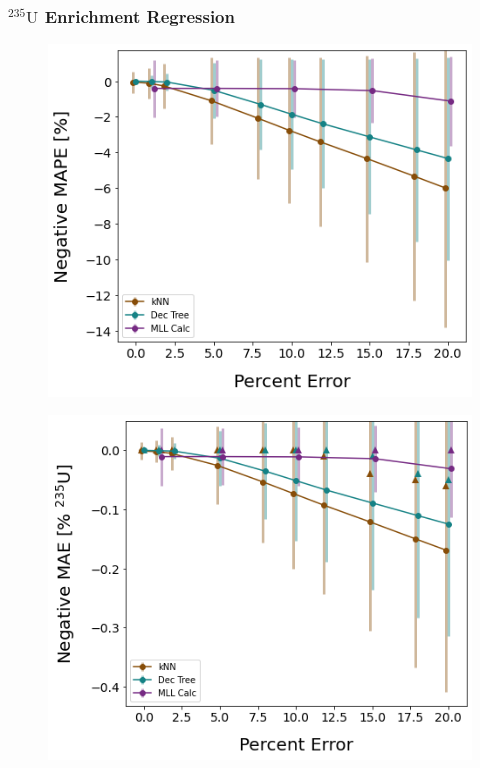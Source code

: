 \begin{frame}
  \frametitle{${}^{235}\text{U}$ Enrichment Regression}
  \begin{adjustwidth}{-15pt}{0pt}
  \begin{minipage}{0.5\textwidth}
    \begin{figure}
      \centering
      \includegraphics[width=\textwidth]{./figures/randerr_compare_nuc29_MAPE_enri.png}
    \end{figure}
  \end{minipage}%
  \hfill
  \begin{minipage}{0.5\textwidth}
    \begin{figure}
      \centering
      \includegraphics[width=\textwidth]{./figures/randerr_compare_nuc29_MAE_enri.png}
    \end{figure}
  \end{minipage}
  \end{adjustwidth}
\end{frame}

